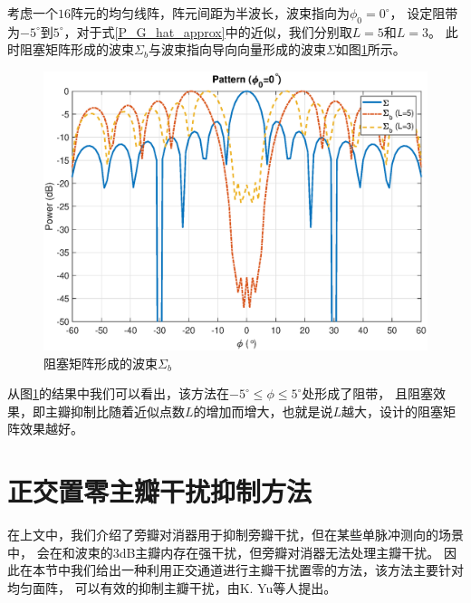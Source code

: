 \documentclass[master]{thesis-uestc}
\begin{document}
考虑一个$16$阵元的均匀线阵，阵元间距为半波长，波束指向为$\phi_0=0^\circ$，
设定阻带为$-5^\circ$到$5^\circ$，对于式\eqref{P_G_hat_approx}中的近似，我们分别取$L=5$和$L=3$。
此时阻塞矩阵形成的波束$\Sigma_b$与波束指向导向向量形成的波束$\Sigma$如图\ref{GSC_Block_dif_L}所示。
\begin{figure}[h]
    \includegraphics[scale=0.4]{pic/GSC_Block.eps}
    \caption{阻塞矩阵形成的波束$\Sigma_b$}
    \label{GSC_Block_dif_L}
\end{figure}

从图\ref{GSC_Block_dif_L}的结果中我们可以看出，该方法在$-5^\circ\le\phi\le5^\circ$处形成了阻带，
且阻塞效果，即主瓣抑制比随着近似点数$L$的增加而增大，也就是说$L$越大，设计的阻塞矩阵效果越好。

\section{正交置零主瓣干扰抑制方法}
在上文中，我们介绍了旁瓣对消器用于抑制旁瓣干扰，但在某些单脉冲测向的场景中，
会在和波束的3dB主瓣内存在强干扰，但旁瓣对消器无法处理主瓣干扰。
因此在本节中我们给出一种利用正交通道进行主瓣干扰置零的方法，该方法主要针对均匀面阵，
可以有效的抑制主瓣干扰，由K. Yu等人提出\cite{Yu_01}。
\end{document}
